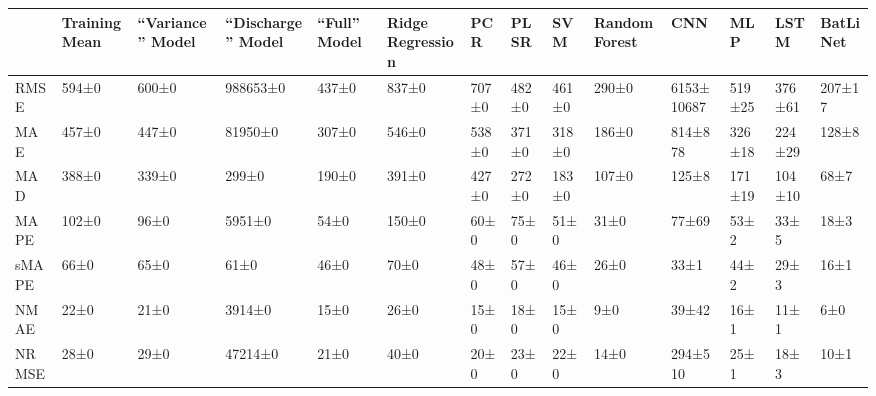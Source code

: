\begin{tabular}{llllllllllllll}
\toprule
 & Training Mean & ``Variance'' Model & ``Discharge'' Model & ``Full'' Model & Ridge Regression & PCR & PLSR & SVM & Random Forest & CNN & MLP & LSTM & BatLiNet \\
\midrule
RMSE & 594±0 & 600±0 & 988653±0 & 437±0 & 837±0 & 707±0 & 482±0 & 461±0 & 290±0 & 6153±10687 & 519±25 & 376±61 & 207±17 \\
MAE & 457±0 & 447±0 & 81950±0 & 307±0 & 546±0 & 538±0 & 371±0 & 318±0 & 186±0 & 814±878 & 326±18 & 224±29 & 128±8 \\
MAD & 388±0 & 339±0 & 299±0 & 190±0 & 391±0 & 427±0 & 272±0 & 183±0 & 107±0 & 125±8 & 171±19 & 104±10 & 68±7 \\
MAPE & 102±0 & 96±0 & 5951±0 & 54±0 & 150±0 & 60±0 & 75±0 & 51±0 & 31±0 & 77±69 & 53±2 & 33±5 & 18±3 \\
sMAPE & 66±0 & 65±0 & 61±0 & 46±0 & 70±0 & 48±0 & 57±0 & 46±0 & 26±0 & 33±1 & 44±2 & 29±3 & 16±1 \\
NMAE & 22±0 & 21±0 & 3914±0 & 15±0 & 26±0 & 15±0 & 18±0 & 15±0 & 9±0 & 39±42 & 16±1 & 11±1 & 6±0 \\
NRMSE & 28±0 & 29±0 & 47214±0 & 21±0 & 40±0 & 20±0 & 23±0 & 22±0 & 14±0 & 294±510 & 25±1 & 18±3 & 10±1 \\
\bottomrule
\end{tabular}

